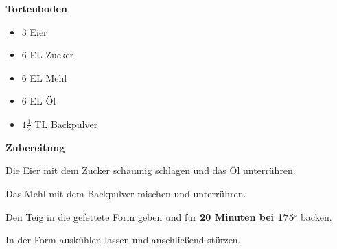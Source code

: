 

\parindent0pt	

\pagestyle{empty}


\textbf{\LARGE{Tortenboden}}%

\hrulefill
\vspace*{\fill}
\begin{multicols}{2}	


\begin{itemize}
\item 3 Eier
\item 6 EL Zucker
\item 6 EL Mehl
\item 6 EL Öl
\item $1\frac{1}{2}$ TL Backpulver
\end{itemize}
\end{multicols}
\vfill									%

\vspace{2cm}
%



\vfill
\newpage
\textbf{{\LARGE Zubereitung}}%

\hrulefill

\vspace*{\fill}
\begin{multicols}{2}

Die Eier mit dem Zucker schaumig schlagen und das Öl unterrühren.\newline

Das Mehl mit dem Backpulver mischen und unterrühren.\newline

Den Teig in die gefettete Form geben und für \textbf{20 Minuten bei 175$^\circ$} backen.\newline

In der Form auskühlen lassen und anschließend stürzen.



\end{multicols}
\vfill
